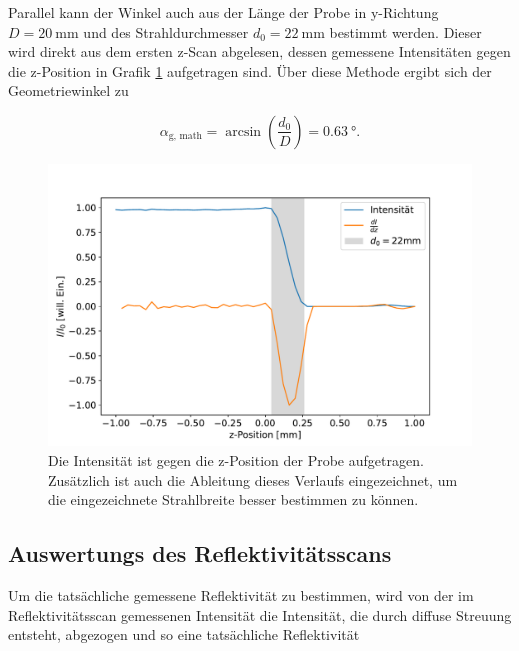     \FloatBarrier

    Parallel kann der Winkel auch aus der Länge der Probe in y-Richtung $D=\SI{20}{\milli\metre}$ und des Strahldurchmesser $d_0=\SI{22}{\milli\metre}$ bestimmt werden. Dieser wird direkt aus dem ersten z-Scan 
    abgelesen, dessen gemessene Intensitäten gegen die z-Position in Grafik \ref{fig:zscan} aufgetragen sind. Über diese Methode ergibt sich der Geometriewinkel zu

    \begin{equation*}
      \alpha_{\text{g, math}} = \arcsin\left(\frac{d_0}{D}\right) = \SI{0.63}{\degree}.
    \end{equation*}

    \FloatBarrier
    \begin{figure}[h]
        \centering
        \includegraphics[width = \textwidth]{abschattung.pdf}
        \caption{Die Intensität ist gegen die z-Position der Probe aufgetragen. Zusätzlich ist auch die Ableitung dieses Verlaufs eingezeichnet, um die eingezeichnete Strahlbreite besser bestimmen zu können.}
        \label{fig:zscan}
      \end{figure}
  
    \FloatBarrier


  \subsection{Auswertungs des Reflektivitätsscans}
    Um die tatsächliche gemessene Reflektivität zu bestimmen, wird von der im Reflektivitätsscan gemessenen Intensität die Intensität, die durch diffuse Streuung entsteht, abgezogen und so eine tatsächliche 
    Reflektivität 
    
